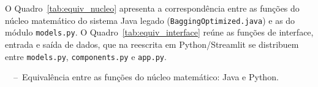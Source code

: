 O Quadro~\ref{tab:equiv_nucleo} apresenta a correspondência entre as funções do núcleo matemático do sistema Java legado (\texttt{BaggingOptimized.java}) e as do módulo \texttt{models.py}. O Quadro~\ref{tab:equiv_interface} reúne as funções de interface, entrada e saída de dados, que na reescrita em Python/Streamlit se distribuem entre \texttt{models.py}, \texttt{components.py} e \texttt{app.py}.

\begingroup
\footnotesize
\renewcommand{\arraystretch}{1.15}
\setlength{\tabcolsep}{4pt}

\begin{center}
  \begin{minipage}{0.85\linewidth}
    \centering
    \quadroname~\thequadro~--~Equivalência entre as funções do núcleo matemático: Java e Python.
  \end{minipage}
\end{center}
\label{tab:equiv_nucleo}%
\vspace{-0.3cm}

